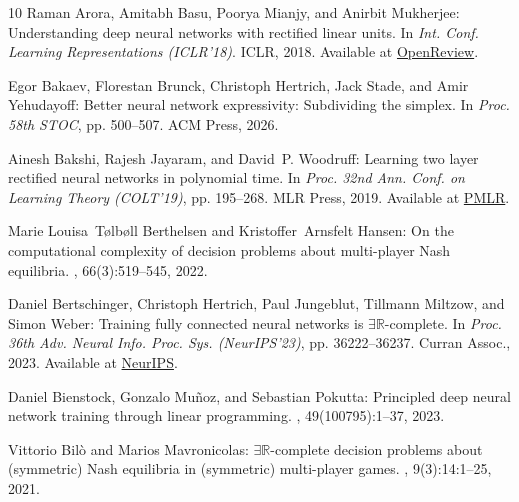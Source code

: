\begin{thebibliography}{10}
{\sc Raman Arora, Amitabh Basu, Poorya Mianjy, and Anirbit Mukherjee}:
  Understanding deep neural networks with rectified linear units.
\newblock In {\em Int. Conf. Learning Representations (ICLR'18)}. ICLR, 2018.
\newblock Available at
  \href{https://openreview.net/forum?id=B1J_rgWRW}{OpenReview}.

{\sc Egor Bakaev, Florestan Brunck, Christoph Hertrich, Jack Stade, and Amir
  Yehudayoff}: Better neural network expressivity: {S}ubdividing the simplex.
\newblock In {\em Proc. 58th STOC}, pp. 500--507. ACM Press, 2026.
\newblock [\epfmtdoi{10.1145/3798129.3800768}]

{\sc Ainesh Bakshi, Rajesh Jayaram, and David~P. Woodruff}: Learning two layer
  rectified neural networks in polynomial time.
\newblock In {\em Proc. 32nd Ann. Conf. on Learning Theory (COLT'19)}, pp.
  195--268. MLR Press, 2019.
\newblock Available at
  \href{https://proceedings.mlr.press/v99/bakshi19a.html}{PMLR}.

{\sc Marie Louisa~T{\o}lb{\o}ll Berthelsen and Kristoffer~Arnsfelt Hansen}: On
  the computational complexity of decision problems about multi-player {N}ash
  equilibria.
, 66(3):519--545, 2022.
\newblock [\epfmtdoi{10.1007/s00224-022-10080-1}]

{\sc Daniel Bertschinger, Christoph Hertrich, Paul Jungeblut, Tillmann Miltzow,
  and Simon Weber}: Training fully connected neural networks is
  $\exists\mathbb{R}$-complete.
\newblock In {\em Proc. 36th Adv. Neural Info. Proc. Sys. (NeurIPS'23)}, pp.
  36222--36237. Curran Assoc., 2023.
\newblock Available at
  \href{https://papers.nips.cc/paper_files/paper/2023/hash/71c31ebf577ffdad5f4a74156daad518-Abstract-Conference.html}{NeurIPS}.

{\sc Daniel Bienstock, Gonzalo Mu{\~n}oz, and Sebastian Pokutta}: Principled
  deep neural network training through linear programming.
, 49(100795):1--37, 2023.

{\sc Vittorio Bil{\`o} and Marios Mavronicolas}: $\exists\mathbb{R}$-complete
  decision problems about (symmetric) {N}ash equilibria in (symmetric)
  multi-player games.
, 9(3):14:1--25, 2021.
\newblock [\epfmtdoi{10.1145/3456758}]


\end{thebibliography}
